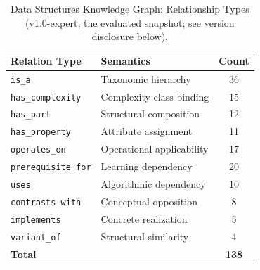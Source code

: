 \documentclass[conference]{IEEEtran}
\begin{document}
\begin{table}[t]
\caption{Data Structures Knowledge Graph: Relationship Types (v1.0-expert,
the evaluated snapshot; see version disclosure below).}
\label{tab:kg_rels}
\centering
\begin{tabular}{llc}
\toprule
\textbf{Relation Type} & \textbf{Semantics} & \textbf{Count} \\
\midrule
\texttt{is\_a}             & Taxonomic hierarchy           & 36 \\
\texttt{has\_complexity}   & Complexity class binding      & 15 \\
\texttt{has\_part}         & Structural composition        & 12 \\
\texttt{has\_property}     & Attribute assignment          & 11 \\
\texttt{operates\_on}      & Operational applicability     & 17 \\
\texttt{prerequisite\_for} & Learning dependency           & 20 \\
\texttt{uses}              & Algorithmic dependency        & 10 \\
\texttt{contrasts\_with}   & Conceptual opposition         &  8 \\
\texttt{implements}        & Concrete realization          &  5 \\
\texttt{variant\_of}       & Structural similarity         &  4 \\
\midrule
\textbf{Total} & & \textbf{138} \\
\bottomrule
\end{tabular}
\end{table}
\end{document}
